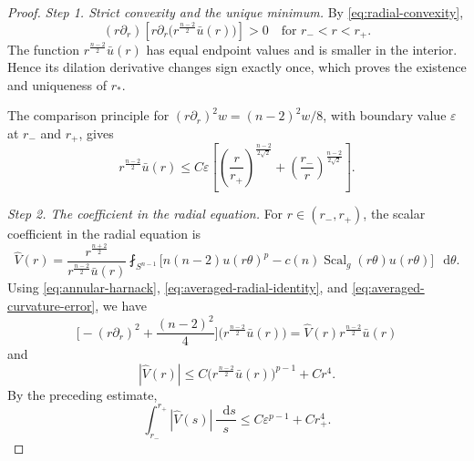 \documentclass[11pt]{article}
\numberwithin{equation}{section}
\theoremstyle{remark}
\newcommand{\Sph}{S}
\newcommand{\pa}{\partial}
\newcommand{\eps}{\varepsilon}
\newcommand{\dd}{\mathop{}\!\mathrm{d}}
\begin{document}
\par
\begin{proof}
\emph{Step 1. Strict convexity and the unique minimum.}
By \eqref{eq:radial-convexity},
\[
 (r\pa_r)
 \left[
 r\pa_r\bigl(r^{\frac{n-2}{2}}\bar u(r)\bigr)
 \right]>0
 \quad\text{for }r_-<r<r_+.
\]
The function \(r^{\frac{n-2}{2}}\bar u(r)\) has equal endpoint values and is smaller in
the interior.  Hence its dilation derivative changes sign exactly once,
which proves the existence and uniqueness of \(r_*\).

{The comparison principle for
\((r\pa_r)^2w=(n-2)^2w/8\), with boundary value \(\eps\) at \(r_-\) and
\(r_+\), gives}
\[
 r^{\frac{n-2}{2}}\bar u(r)
 \le C\eps\left[
 \left(\frac r{r_+}\right)^{\frac{n-2}{2\sqrt2}}
 +\left(\frac{r_-}{r}\right)^{\frac{n-2}{2\sqrt2}}
 \right].
\]

{
\emph{Step 2. The coefficient in the radial equation.}
For \(r\in(r_-,r_+)\), the scalar coefficient in the radial equation is
\[
 \widehat V(r)
 =
 \frac{r^{\frac{n+2}{2}}}{r^{\frac{n-2}{2}}\bar u(r)}
 \fint_{\Sph^{n-1}}
 \bigl[n(n-2)u(r\theta)^p-c(n)\operatorname{Scal}_g(r\theta)u(r\theta)\bigr]
 \,\dd\theta.
\]
{Using \eqref{eq:annular-harnack},
\eqref{eq:averaged-radial-identity}, and
\eqref{eq:averaged-curvature-error}, we have}
\[
 \bigl[-(r\pa_r)^2+\frac{(n-2)^2}{4}\bigr]\bigl(r^{\frac{n-2}{2}}\bar u(r)\bigr)
 =
 \widehat V(r)r^{\frac{n-2}{2}}\bar u(r)
\]
and
\[
 |\widehat V(r)|
 \le C\bigl(r^{\frac{n-2}{2}}\bar u(r)\bigr)^{p-1}+Cr^4.
\]
By the preceding estimate,
\begin{equation}\label{eq:q-ode-L1}
 \int_{r_-}^{r_+}|\widehat V(s)|\,\frac{\dd s}{s}
 \le C\eps^{p-1}+Cr_+^4.
\end{equation}
}


\end{proof}
\end{document}
